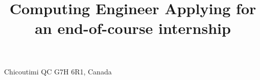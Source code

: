 \title{
    Computing Engineer \newline
    \small Applying for an end-of-course internship
}
\address{639 rue Émile-Girardin}{Chicoutimi QC G7H 6R1, Canada}
